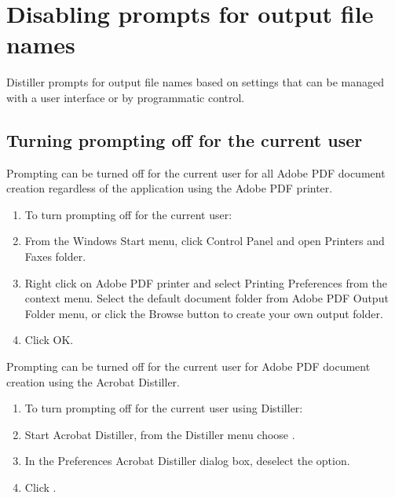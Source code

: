 \documentclass[letterpaper,12pt,english,openany,oneside]{sphinxmanual}
\begin{document}
\section{Disabling prompts for output file names}
\label{\detokenize{Distiller_WinIntro:disabling-prompts-for-output-file-names}}
Distiller prompts for output file names based on settings that can be managed with a user interface or by programmatic control.


\subsection{Turning prompting off for the current user}
\label{\detokenize{Distiller_WinIntro:turning-prompting-off-for-the-current-user}}
Prompting can be turned off for the current user for all Adobe PDF document creation regardless of the application using the Adobe PDF printer.
\begin{enumerate}
%
\item {} 
To turn prompting off for the current user:

\item {} 
From the Windows Start menu, click Control Panel and open Printers and Faxes folder.

\item {} 
Right click on Adobe PDF printer and select Printing Preferences from the context menu. Select the default document folder from Adobe PDF Output Folder menu, or click the Browse button to create your own output folder.

\item {} 
Click OK.

\end{enumerate}

Prompting can be turned off for the current user for Adobe PDF document creation using the Acrobat Distiller.
\begin{enumerate}
%
\item {} 
To turn prompting off for the current user using Distiller:

\item {} 
Start Acrobat Distiller, from the Distiller menu choose  .

\item {} 
In the Preferences \sphinxhyphen{} Acrobat Distiller dialog box, deselect the  option.

\item {} 
Click  .

\end{enumerate}
\end{document}
